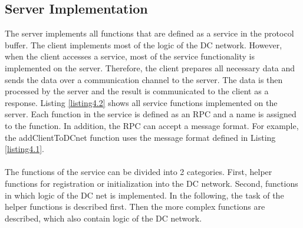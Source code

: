 \subsection{Server Implementation}
The server implements all functions that are defined as a service in the protocol buffer. The client implements most of the logic of the DC network. However, when the client accesses a service, most of the service functionality is implemented on the server. Therefore, the client prepares all necessary data and sends the data over a communication channel to the server. The data is then processed by the server and the result is communicated to the client as a response. Listing \ref{listing4.2} shows all service functions implemented on the server. %
Each function in the service is defined as an RPC and a name is assigned to the function. In addition, the RPC can accept a message format. For example, the addClientToDCnet function uses the message format defined in Listing \ref{listing4.1}. 
\\

\\ The functions of the service can be divided into 2 categories. First, helper functions for registration or initialization into the DC network. Second, functions in which logic of the DC net is implemented. In the following, the task of the helper functions is described first. Then the more complex functions are described, which also contain logic of the DC network.\\
